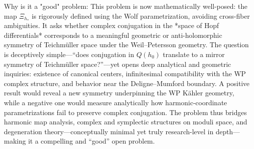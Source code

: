 Why is it a "good" problem:  
This problem is now mathematically well-posed: the map \(\Xi_{h_*}\) is rigorously defined using the Wolf parametrization, avoiding cross-fiber ambiguities.  It asks whether complex conjugation in the *space of Hopf differentials* corresponds to a meaningful geometric or anti-holomorphic symmetry of Teichmüller space under the Weil–Petersson geometry.  
The question is deceptively simple—“does conjugation in \(Q(h_0)\) translate to a mirror symmetry of Teichmüller space?”—yet opens deep analytical and geometric inquiries: existence of canonical centers, infinitesimal compatibility with the WP complex structure, and behavior near the Deligne–Mumford boundary.  
A positive result would reveal a new symmetry underpinning the WP Kähler geometry, while a negative one would measure analytically how harmonic-coordinate parametrizations fail to preserve complex conjugation.  
The problem thus bridges harmonic map analysis, complex and symplectic structures on moduli space, and degeneration theory—conceptually minimal yet truly research-level in depth—making it a compelling and “good” open problem.